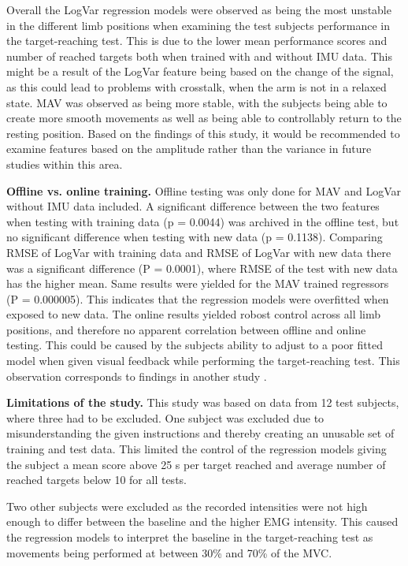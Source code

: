 \begin{multicols}{2}
Overall the LogVar regression models were observed as being the most unstable in the different limb positions when examining the test subjects performance in the target-reaching test. This is due to the lower mean performance scores and number of reached targets both when trained with and without IMU data. This might be a result of the LogVar feature being based on the change of the signal, as this could lead to problems with crosstalk, when the arm is not in a relaxed state. MAV was observed as being more stable, with the subjects being able to create more smooth movements as well as being able to controllably return to the resting position. Based on the findings of this study, it would be recommended to examine features based on the amplitude rather than the variance in future studies within this area.

\textbf{Offline vs. online training.}
Offline testing was only done for MAV and LogVar without IMU data included. A significant difference between the two features when testing with training data (p = 0.0044) was archived in the offline test, but no significant difference when testing with new data (p = 0.1138). Comparing RMSE of LogVar with training data and RMSE of LogVar with new data there was a significant difference (P = 0.0001), where RMSE of the test with new data has the higher mean. Same results were yielded for the MAV trained regressors (P = 0.000005). This indicates that the regression models were overfitted when exposed to new data. The online results yielded robost control across all limb positions, and therefore no apparent correlation between offline and online testing. This could be caused by the subjects ability to adjust to a poor fitted model when given visual feedback while performing the target-reaching test. This observation corresponds to findings in another study \cite{jiang2010}.

\textbf{Limitations of the study.}
This study was based on data from 12 test subjects, where three had to be excluded. One subject was excluded due to misunderstanding the given instructions and thereby creating an unusable set of training and test data. This limited the control of the regression models giving the subject a mean score above 25 s per target reached and average number of reached targets below 10 for all tests.

Two other subjects were excluded as the recorded intensities were not high enough to differ between the baseline and the higher EMG intensity. This caused the regression models to interpret the baseline in the target-reaching test as movements being performed at between 30\% and 70\% of the MVC. 


\end{multicols}

